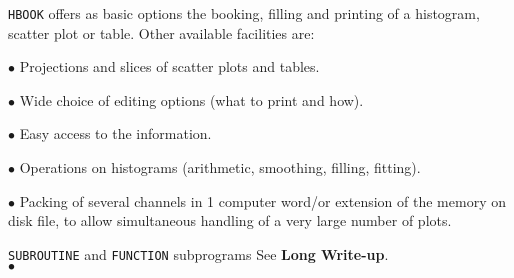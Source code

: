                            
  
\Submitter{}                              \Submitted{ }
{\tt HBOOK} offers as basic options the booking, filling and printing
of a histogram, scatter plot or table. Other available facilities
are:
\begin{DLtt}{12}
\item[$\bullet$]  Projections and slices of scatter plots and tables.
\item[$\bullet$]  Wide choice of editing options (what to print and how).
\item[$\bullet$]  Easy access to the information.
\item[$\bullet$]  Operations on histograms (arithmetic, smoothing,
filling, fitting).
\item[$\bullet$]  Packing of several channels in 1 computer word/or
extension of the memory on disk file, to allow simultaneous handling of
a very large number of plots.
\end{DLtt}
\Structure
{\tt SUBROUTINE} and {\tt FUNCTION} subprograms
\Usage
See {\bf Long Write-up}.
\\ $\bullet$
